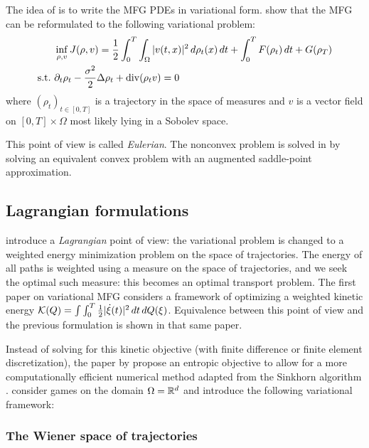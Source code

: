 \documentclass[../report.tex]{subfiles}
\begin{document}
The idea of \cite{benamou:hal-01295299} is to write the MFG PDEs in variational form.
\textcite{benamou:hal-01295299} show that the MFG can be reformulated to the following variational problem:
\begin{equation}\label{eq:EulerianProblem}
\begin{aligned}
&\inf_{\rho,v} J(\rho, v) =
\frac{1}{2}\int_0^T\int_\Omega |v(t,x)|^2 \,d\rho_t(x)\,dt + \int_0^T F(\rho_t)\,dt + G(\rho_T)
\\
\mathrm{s.t.}\ &\partial_t \rho_t - \frac{\sigma^2}{2}\Delta \rho_t + \operatorname{div}(\rho_t v) = 0
\end{aligned}
\end{equation}
where $(\rho_t)_{t\in[0,T]}$ is a trajectory in the space of measures and $v$ is a vector field on $[0,T] \times \Omega$ most likely lying in a Sobolev space.

This point of view is called \textit{Eulerian}. The nonconvex problem is solved in \textcite{benamou:hal-01295299,benamou2015lagrangian} by solving an equivalent convex problem with an augmented saddle-point approximation.


\subsection{Lagrangian formulations}

\textcite{benamou:hal-01295299,benamou2018entropy} introduce a \textit{Lagrangian} point of view: the variational problem is changed to a weighted energy minimization problem on the space of trajectories. The energy of all paths is weighted using a measure on the space of trajectories, and we seek the optimal such measure: this becomes an optimal transport problem. The first paper on variational MFG \cite{benamou:hal-01295299} considers a framework of optimizing a weighted kinetic energy $\mathcal{K}(Q) = \int \int_0^T \frac{1}{2}|\dot\xi(t)|^2\,dt\,dQ(\xi)$. Equivalence between this point of view and the previous formulation is shown in that same paper.

Instead of solving for this kinetic objective (with finite difference or finite element discretization), the paper by \textcite{benamou2018entropy} propose an entropic objective to allow for a more computationally efficient numerical method adapted from the Sinkhorn algorithm \textcite{cuturi2013sinkhorn}. \textcite{benamou2018entropy} consider games on the domain $\Omega = \mathbb{R}^d$ and introduce the following variational framework:


\subsubsection{The Wiener space of trajectories}
\end{document}
